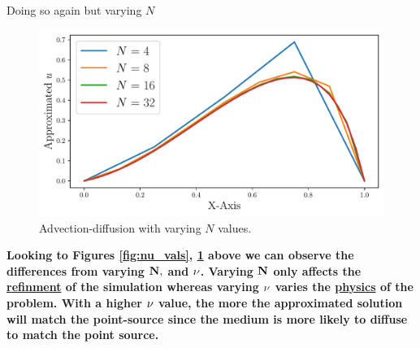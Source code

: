 \pagebreak

\begin{adjustwidth}{2.5em}{0pt}      
Doing so again but varying $N$

\begin{figure}[h]
    \centering
    \includegraphics[width = 0.8\linewidth]{q5/varying_Ns.pdf}
    \caption{Advection-diffusion with varying $N$ values.}
    \label{fig:N_vals}
\end{figure}


\begin{fminipage}{0.8\linewidth}
    \textbf{Looking to Figures \ref{fig:nu_vals}, \ref{fig:N_vals} above we can observe the differences from varying $\bf N,$ and $\bf \nu$. Varying $\bf N$ only affects the \underline{refinment} of the simulation whereas varying $\bf \nu$ varies the \underline{physics} of the problem. With a higher $\bf \nu$ value, the more the approximated solution will match the point-source since the medium is more likely to diffuse to match the point source.}
\end{fminipage}
    
\end{adjustwidth}